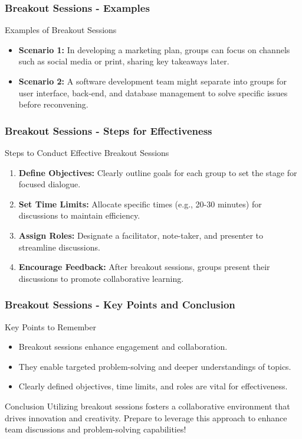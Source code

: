 \documentclass[aspectratio=169]{beamer}
\begin{document}
\begin{frame}[fragile]
    \frametitle{Breakout Sessions - Examples}
    \begin{block}{Examples of Breakout Sessions}
        \begin{itemize}
            \item \textbf{Scenario 1:} In developing a marketing plan, groups can focus on channels such as social media or print, sharing key takeaways later.
            \item \textbf{Scenario 2:} A software development team might separate into groups for user interface, back-end, and database management to solve specific issues before reconvening.
        \end{itemize}
    \end{block}
\end{frame}

\begin{frame}[fragile]
    \frametitle{Breakout Sessions - Steps for Effectiveness}
    \begin{block}{Steps to Conduct Effective Breakout Sessions}
        \begin{enumerate}
            \item \textbf{Define Objectives:} Clearly outline goals for each group to set the stage for focused dialogue.
            \item \textbf{Set Time Limits:} Allocate specific times (e.g., 20-30 minutes) for discussions to maintain efficiency.
            \item \textbf{Assign Roles:} Designate a facilitator, note-taker, and presenter to streamline discussions.
            \item \textbf{Encourage Feedback:} After breakout sessions, groups present their discussions to promote collaborative learning.
        \end{enumerate}
    \end{block}
\end{frame}

\begin{frame}[fragile]
    \frametitle{Breakout Sessions - Key Points and Conclusion}
    \begin{block}{Key Points to Remember}
        \begin{itemize}
            \item Breakout sessions enhance engagement and collaboration.
            \item They enable targeted problem-solving and deeper understandings of topics.
            \item Clearly defined objectives, time limits, and roles are vital for effectiveness.
        \end{itemize}
    \end{block}
    \begin{block}{Conclusion}
        Utilizing breakout sessions fosters a collaborative environment that drives innovation and creativity. Prepare to leverage this approach to enhance team discussions and problem-solving capabilities!
    \end{block}
\end{frame}
\end{document}
